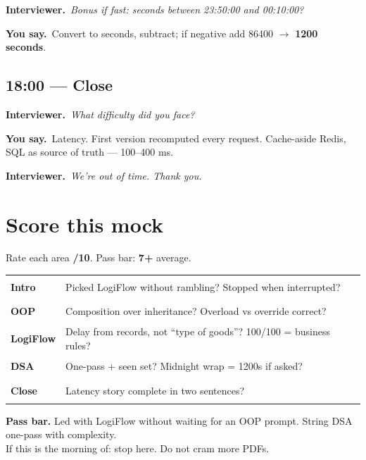 \documentclass[11pt,a4paper]{article}
\newcommand{\card}[1]{%
  \par\vspace{4pt}%
  \noindent\colorbox{soft}{%
    \parbox{\dimexpr\textwidth-2\fboxsep}{\vspace{5pt}#1\vspace{5pt}}%
  }\par\vspace{5pt}%
}
\newcommand{\IV}[1]{\par\vspace{4pt}\noindent\textcolor{qcol}{\textbf{Interviewer.}}~\textit{#1}\par}
\newcommand{\You}[1]{%
  \par\vspace{2pt}%
  \noindent\colorbox{youbg}{%
    \parbox{\dimexpr\textwidth-2\fboxsep}{\vspace{3pt}\textcolor{you}{\textbf{\small You say.}}~#1\vspace{3pt}}%
  }\par}
\begin{document}
\IV{Bonus if fast: seconds between 23:50:00 and 00:10:00?}
\You{Convert to seconds, subtract; if negative add 86400 $\rightarrow$ \textbf{1200 seconds}.}

\subsection*{18:00 --- Close}
\IV{What difficulty did you face?}
\You{Latency. First version recomputed every request. Cache-aside Redis, SQL as source of truth --- 100--400 ms.}

\IV{We're out of time. Thank you.}

\section{Score this mock}

Rate each area \textbf{/10}. Pass bar: \textbf{7+} average.

\begin{tabular}{@{}p{3cm}p{9.5cm}c@{}}
\textbf{Intro} & Picked LogiFlow without rambling? Stopped when interrupted? & \rule{1.4cm}{0.4pt} \\
\textbf{OOP} & Composition over inheritance? Overload vs override correct? & \rule{1.4cm}{0.4pt} \\
\textbf{LogiFlow} & Delay from records, not ``type of goods''? 100/100 = business rules? & \rule{1.4cm}{0.4pt} \\
\textbf{DSA} & One-pass + seen set? Midnight wrap = 1200s if asked? & \rule{1.4cm}{0.4pt} \\
\textbf{Close} & Latency story complete in two sentences? & \rule{1.4cm}{0.4pt} \\
\end{tabular}

\vspace{8pt}
\card{\textbf{Pass bar.} Led with LogiFlow without waiting for an OOP prompt. String DSA one-pass with complexity.\\[4pt]
If this is the morning of: stop here. Do not cram more PDFs.}
\end{document}
